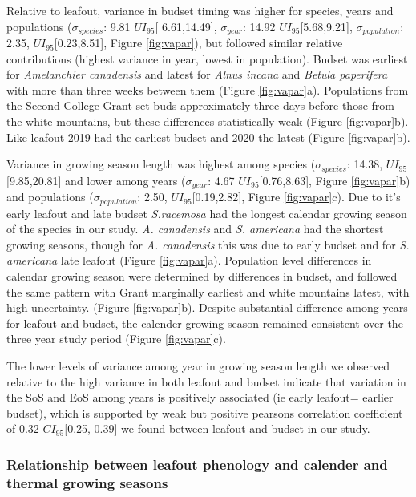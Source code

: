 \documentclass[12 pt]{article}
\begin{document}
Relative to leafout, variance in budset timing was higher for species, years and populations ($\sigma_{species}$: 9.81 $UI_{95}$[ 6.61,14.49], $\sigma_{year}$: 14.92 $UI_{95}$[5.68,9.21], $\sigma_{population}$: 2.35, $UI_{95}$[0.23,8.51], Figure \ref{fig:vapar}), but followed similar relative contributions (highest variance in year, lowest in population).
Budset was earliest for \emph{Amelanchier canadensis} and latest for \emph{Alnus incana} and \emph{Betula paperifera} with more than three weeks between them (Figure \ref{fig:vapar}a). Populations from the Second College Grant set buds approximately three days before those from the white mountains, but these differences statistically weak (Figure \ref{fig:vapar}b). Like leafout 2019 had the earliest budset and 2020 the latest (Figure \ref{fig:vapar}b).

Variance in growing season length was highest among species ($\sigma_{species}$: 14.38, $UI_{95}$[9.85,20.81] and lower among years ($\sigma_{year}$: 4.67 $UI_{95}$[0.76,8.63], Figure \ref{fig:vapar}b) and populations ($\sigma_{population}$: 2.50, $UI_{95}$[0.19,2.82], Figure \ref{fig:vapar}c). Due to it's early leafout and late budset \emph{S.racemosa} had the longest calendar growing season of the species in our study. \emph{A. canadensis} and \emph{S. americana} had the shortest growing seasons, though for \emph{A. canadensis} this was due to early budset and for \emph{S. americana} late leafout (Figure \ref{fig:vapar}a). Population level differences in calendar growing season were determined by differences in budset, and followed the same pattern with Grant marginally earliest and white mountains  latest, with high uncertainty. (Figure \ref{fig:vapar}b). Despite substantial difference among years for leafout and budset, the calender growing season remained consistent over the three year study period (Figure \ref{fig:vapar}c).

The lower levels of variance among year in growing season length we observed relative to the high variance in both leafout and budset indicate that variation in the SoS and EoS among years is positively associated (ie early leafout= earlier budset), which is supported by weak but positive pearsons correlation coefficient of 0.32 $CI_{95}$[0.25, 0.39] we found between leafout and budset in our study.

\subsubsection{Relationship between leafout phenology and calender and thermal growing seasons}
\end{document}
